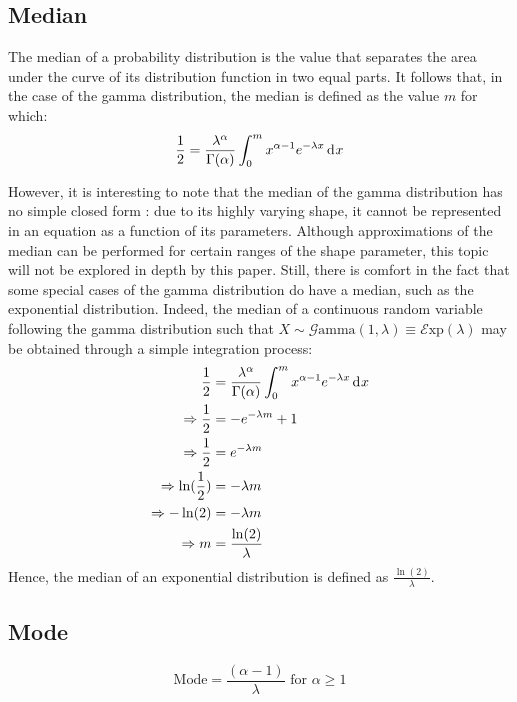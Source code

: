 \documentclass[12pt]{article}
\newcommand{\E}{\mathcal{E}}
\newcommand{\G}{\mathcal{G}}
\begin{document}
\subsection{Median}
The median of a probability distribution is the value that separates the area under the curve of its distribution
function in two equal parts. It follows that, in the case of the gamma distribution, the median is defined as the value
$m$ for which:
\begin{equation}
	\frac{1}{2} = \frac{\lambda^\alpha}{\Gamma(\alpha)} \int^m_0 x^{\alpha-1} e^{-\lambda x}\mathop{}\!\mathrm{d^{}}x
\end{equation}

However, it is interesting to note that the median of the gamma distribution has no simple closed form : due to its
highly varying shape, it cannot be represented in an equation as a function of its parameters. Although approximations
of the median can be performed for certain ranges of the shape parameter, this topic will not be explored in depth by
this paper. Still, there is comfort in the fact that some special cases of the gamma distribution do have a median, such
as the exponential distribution. Indeed, the median of a continuous random variable following the gamma distribution
such that $X\sim\G\text{amma}(1, \lambda)\equiv\E\text{xp}(\lambda)$ may be obtained through a simple integration
process:
\begin{equation}
	\begin{split}
		\frac{1}{2}					&=	\frac{\lambda^\alpha}{\Gamma(\alpha)} \int^m_0 x^{\alpha-1} e^{-\lambda x}\mathop{}\!\mathrm{d^{}}x\\
		\Rightarrow\frac{1}{2}		&=	-e^{-\lambda m} + 1\\
		\Rightarrow\frac{1}{2}		&=	e^{-\lambda m}\\
		\Rightarrow\ln(\frac{1}{2})	&=	-\lambda m\\
		\Rightarrow-\ln(2)			&=	-\lambda m\\
		\Rightarrow m				&=	\frac{\ln(2)}{\lambda}
	\end{split}
\end{equation}
Hence, the median of an exponential distribution is defined as $\frac{\ln(2)}{\lambda}$.

\subsection{Mode}
\begin{equation}\label{eq:gamma-mode-2}
	\text{Mode} = \frac{(\alpha-1)}{\lambda}\text{ for }\alpha \geq 1
\end{equation}
\end{document}
